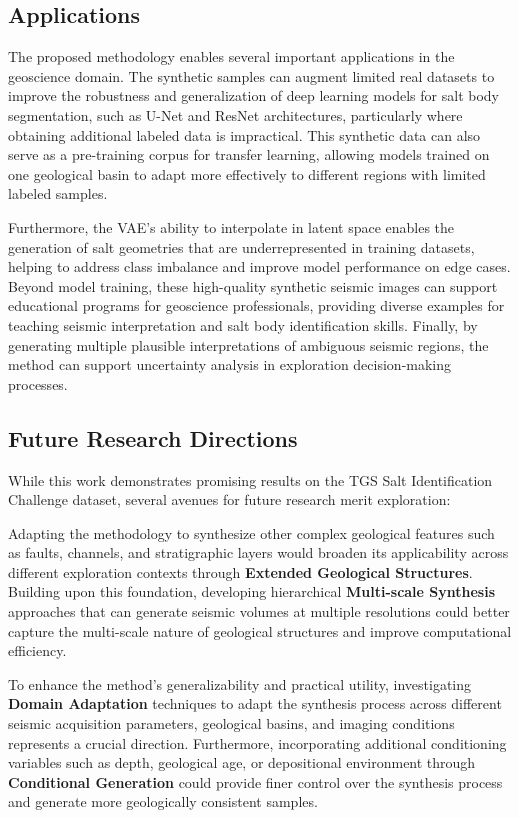 ﻿\documentclass{ieeeaccess}
\begin{document}
\subsection{Applications}

The proposed methodology enables several important applications in the geoscience domain. The synthetic samples can augment limited real datasets to improve the robustness and generalization of deep learning models for salt body segmentation, such as U-Net and ResNet architectures, particularly where obtaining additional labeled data is impractical. This synthetic data can also serve as a pre-training corpus for transfer learning, allowing models trained on one geological basin to adapt more effectively to different regions with limited labeled samples.

Furthermore, the VAE's ability to interpolate in latent space enables the generation of salt geometries that are underrepresented in training datasets, helping to address class imbalance and improve model performance on edge cases. Beyond model training, these high-quality synthetic seismic images can support educational programs for geoscience professionals, providing diverse examples for teaching seismic interpretation and salt body identification skills. Finally, by generating multiple plausible interpretations of ambiguous seismic regions, the method can support uncertainty analysis in exploration decision-making processes.


\subsection{Future Research Directions}

While this work demonstrates promising results on the TGS Salt Identification Challenge dataset, several avenues for future research merit exploration:

Adapting the methodology to synthesize other complex geological features such as faults, channels, and stratigraphic layers would broaden its applicability across different exploration contexts through \textbf{Extended Geological Structures}. Building upon this foundation, developing hierarchical \textbf{Multi-scale Synthesis} approaches that can generate seismic volumes at multiple resolutions could better capture the multi-scale nature of geological structures and improve computational efficiency.

To enhance the method's generalizability and practical utility, investigating \textbf{Domain Adaptation} techniques to adapt the synthesis process across different seismic acquisition parameters, geological basins, and imaging conditions represents a crucial direction. Furthermore, incorporating additional conditioning variables such as depth, geological age, or depositional environment through \textbf{Conditional Generation} could provide finer control over the synthesis process and generate more geologically consistent samples.
\end{document}
